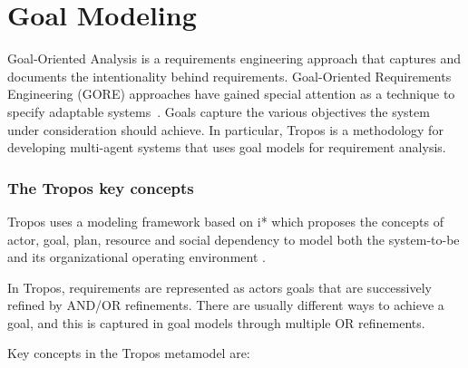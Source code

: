 \section{Goal Modeling}

Goal-Oriented Analysis is a requirements engineering approach that captures and documents the intentionality behind requirements. Goal-Oriented Requirements Engineering (GORE) approaches have gained special attention as a technique to specify adaptable systems~\cite{morandini_goal-oriented_2009}. Goals capture the various objectives the system under consideration should achieve. In particular, Tropos\cite{bresciani_tropos:_2004} is a methodology for developing multi-agent systems that uses goal models for requirement analysis.

\subsubsection{The Tropos key concepts}

Tropos uses a modeling framework based on i* \cite{yu_modelling_1996} which proposes the concepts of actor, goal, plan, resource and social dependency to model both the system-to-be and its organizational operating environment \cite{bresciani_tropos:_2004} \cite{morandini_tropos_2014}.

In Tropos, requirements are represented as actors goals that are successively refined by AND/OR refinements. There are usually different ways to achieve a goal, and this is captured in goal models through multiple OR refinements.

Key concepts in the Tropos metamodel are:

